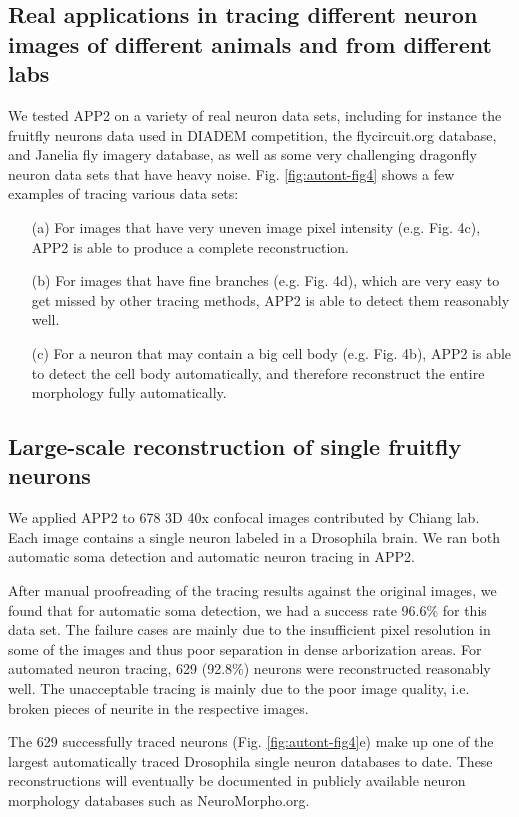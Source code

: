 \subsection{Real applications in tracing different neuron images of different animals and from different labs}
We tested APP2 on a variety of real neuron data sets, including for instance the fruitfly neurons data used in DIADEM competition, the flycircuit.org database, and Janelia fly imagery database, as well as some very challenging dragonfly neuron data sets \cite{gonzalez2013eight} that have heavy noise. 
Fig. \ref{fig:autont-fig4} shows a few examples of tracing various data sets:
\begin{itemize}
\item[(a)]	For images that have very uneven image pixel intensity (e.g. Fig. 4c), APP2 is able to produce a complete reconstruction. 
\item[(b)]	For images that have fine branches (e.g. Fig. 4d), which are very easy to get missed by other tracing methods, APP2 is able to detect them reasonably well. 
\item[(c)]	For a neuron that may contain a big cell body (e.g. Fig. 4b), APP2 is able to detect the cell body automatically, and therefore reconstruct the entire morphology fully automatically.
\end{itemize}

\subsection{Large-scale reconstruction of single fruitfly neurons}
We applied APP2 to 678 3D 40x confocal images contributed by Chiang lab. Each image contains a single neuron labeled in a Drosophila brain. We ran both automatic soma detection and automatic neuron tracing in APP2. 

After manual proofreading of the tracing results against the original images, we found that for automatic soma detection, we had a success rate 96.6\% for this data set. The failure cases are mainly due to the insufficient pixel resolution in some of the images and thus poor separation in dense arborization areas. For automated neuron tracing, 629 (92.8\%) neurons were reconstructed reasonably well. The unacceptable tracing is mainly due to the poor image quality, i.e. broken pieces of neurite in the respective images. 

The 629 successfully traced neurons (Fig. \ref{fig:autont-fig4}e) make up one of the largest automatically traced Drosophila single neuron databases to date. These reconstructions will eventually be documented in publicly available neuron morphology databases such as NeuroMorpho.org. 

